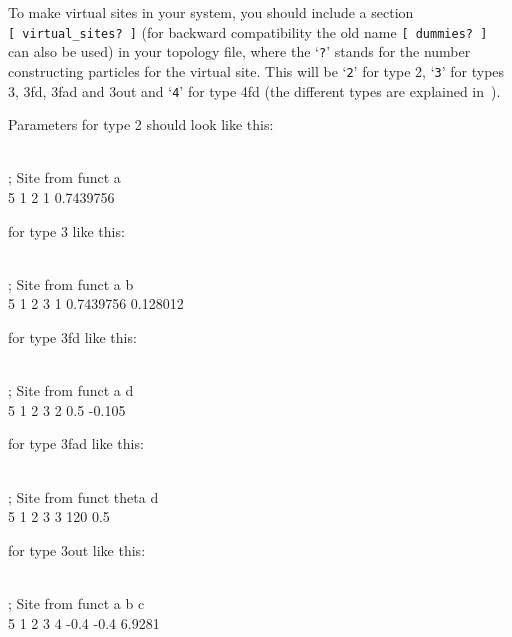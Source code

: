 To make virtual sites in your system, you should include a section
{\tt [~virtual\_sites?~]} (for backward compatibility the old name
{\tt [~dummies?~]} can also be used) in your topology file,
where the `{\tt ?}' stands
for the number constructing particles for the virtual site. This will be
`{\tt 2}' for type 2, `{\tt 3}' for types 3, 3fd, 3fad and 3out and
`{\tt 4}' for type 4fd (the different types are explained
in~).

Parameters for type 2 should look like this:\\
{\small\begin{tt}
 \\
; Site  from        funct  a \\
5       1     2     1      0.7439756\\
\end{tt}}

for type 3 like this:\\
{\small\begin{tt}
\\
; Site  from               funct   a          b\\
5       1     2     3      1       0.7439756  0.128012\\
\end{tt}}

for type 3fd like this:\\
{\small\begin{tt}
\\
; Site  from               funct   a          d\\
5       1     2     3      2       0.5        -0.105\\
\end{tt}}

for type 3fad like this:\\
{\small\begin{tt}
\\
; Site  from               funct   theta      d\\
5       1     2     3      3       120        0.5\\
\end{tt}}

for type 3out like this:\\
{\small\begin{tt}
\\
; Site  from               funct   a          b          c\\
5       1     2     3      4       -0.4       -0.4       6.9281\\
\end{tt}}

